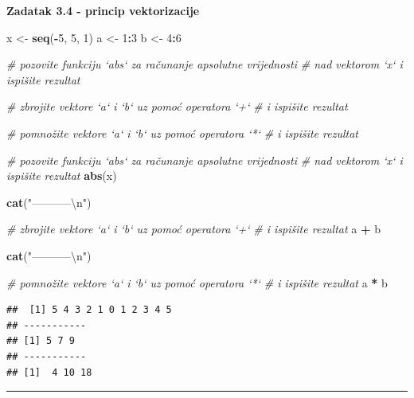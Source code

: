 \documentclass[]{book}
\newenvironment{Shaded}{\begin{snugshade}}{\end{snugshade}}
\newcommand{\KeywordTok}[1]{\textcolor[rgb]{0.13,0.29,0.53}{\textbf{#1}}}
\newcommand{\DecValTok}[1]{\textcolor[rgb]{0.00,0.00,0.81}{#1}}
\newcommand{\CharTok}[1]{\textcolor[rgb]{0.31,0.60,0.02}{#1}}
\newcommand{\StringTok}[1]{\textcolor[rgb]{0.31,0.60,0.02}{#1}}
\newcommand{\CommentTok}[1]{\textcolor[rgb]{0.56,0.35,0.01}{\textit{#1}}}
\newcommand{\OperatorTok}[1]{\textcolor[rgb]{0.81,0.36,0.00}{\textbf{#1}}}
\newcommand{\NormalTok}[1]{#1}
\theoremstyle{definition}
\theoremstyle{definition}
\theoremstyle{definition}
\theoremstyle{remark}
\begin{document}
\textbf{Zadatak 3.4 - princip vektorizacije}

\begin{Shaded}
\begin{Highlighting}[]
\NormalTok{x <-}\StringTok{ }\KeywordTok{seq}\NormalTok{(}\OperatorTok{-}\DecValTok{5}\NormalTok{, }\DecValTok{5}\NormalTok{, }\DecValTok{1}\NormalTok{)}
\NormalTok{a <-}\StringTok{ }\DecValTok{1}\OperatorTok{:}\DecValTok{3}
\NormalTok{b <-}\StringTok{ }\DecValTok{4}\OperatorTok{:}\DecValTok{6}


\CommentTok{# pozovite funkciju `abs` za računanje apsolutne vrijednosti}
\CommentTok{# nad vektorom `x` i ispišite rezultat}


\CommentTok{# zbrojite vektore `a` i `b` uz pomoć operatora `+`}
\CommentTok{# i ispišite rezultat}


\CommentTok{# pomnožite vektore `a` i `b` uz pomoć operatora `*`}
\CommentTok{# i ispišite rezultat}
\end{Highlighting}
\end{Shaded}

\begin{Shaded}
\begin{Highlighting}[]
\CommentTok{# pozovite funkciju `abs` za računanje apsolutne vrijednosti}
\CommentTok{# nad vektorom `x` i ispišite rezultat}
\KeywordTok{abs}\NormalTok{(x)}

\KeywordTok{cat}\NormalTok{(}\StringTok{"-----------}\CharTok{\textbackslash{}n}\StringTok{"}\NormalTok{)}

\CommentTok{# zbrojite vektore `a` i `b` uz pomoć operatora `+`}
\CommentTok{# i ispišite rezultat}
\NormalTok{a }\OperatorTok{+}\StringTok{ }\NormalTok{b}

\KeywordTok{cat}\NormalTok{(}\StringTok{"-----------}\CharTok{\textbackslash{}n}\StringTok{"}\NormalTok{)}

\CommentTok{# pomnožite vektore `a` i `b` uz pomoć operatora `*`}
\CommentTok{# i ispišite rezultat}
\NormalTok{a }\OperatorTok{*}\StringTok{ }\NormalTok{b}
\end{Highlighting}
\end{Shaded}

\begin{verbatim}
##  [1] 5 4 3 2 1 0 1 2 3 4 5
## -----------
## [1] 5 7 9
## -----------
## [1]  4 10 18
\end{verbatim}

\begin{center}\rule{0.5\linewidth}{\linethickness}\end{center}
\end{document}
